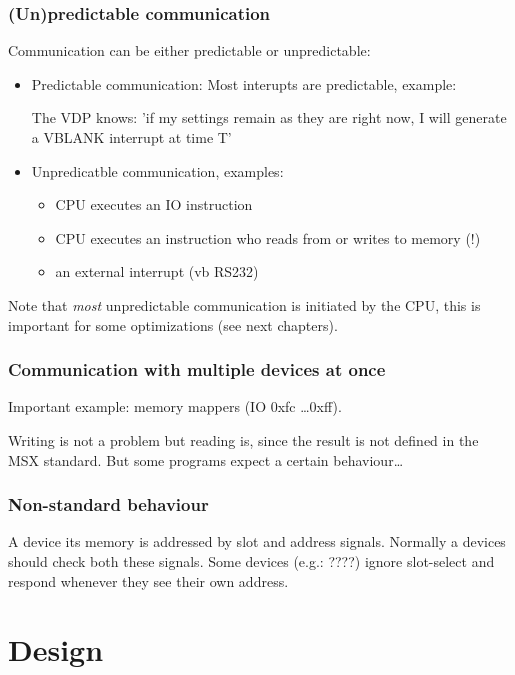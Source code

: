 \documentclass[11pt, a4paper]{report}
\begin{document}
\subsection{(Un)predictable communication}

Communication can be either predictable or unpredictable:
\begin{itemize}
\item Predictable communication: Most interupts are predictable, example:

The VDP knows: 'if my settings remain as they are right now, I will
generate a VBLANK interrupt at time T'

\item Unpredicatble communication, examples:
	\begin{itemize}
	\item CPU executes an IO instruction
	\item CPU executes an instruction who reads from or writes to memory (!)
	\item an external interrupt (vb RS232)
	\end{itemize}
\end{itemize}

Note that \emph{most} unpredictable communication is initiated by the CPU, this is
important for some optimizations (see next chapters).


\subsection{Communication with multiple devices at once}

Important example: memory mappers (IO 0xfc \ldots 0xff).

Writing is not a problem but reading is, since the result is not defined in the MSX
standard. But some programs expect a certain behaviour\ldots


\subsection {Non-standard behaviour}

A device its memory is addressed by slot and address signals. Normally a devices
should check both these signals. Some devices (e.g.: ????) ignore slot-select
and respond whenever they see their own address.




\chapter{Design}
\end{document}
